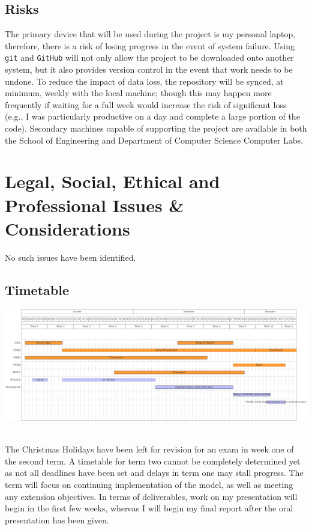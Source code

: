 \documentclass[12pt,a4paper]{article}
\begin{document}
\subsection{Risks}
The primary device that will be used during the project is my personal laptop, therefore, there is a risk of losing 
progress in the event of system failure. Using \texttt{git} and \texttt{GitHub} will not only allow the project to 
be downloaded onto another system, but it also provides version control in the event that work needs to be undone. 
To reduce the impact of data loss, the repository will be synced, at minimum, weekly with the local machine; though 
this may happen more frequently if waiting for a full week would increase the risk of significant loss (e.g., I was 
particularly productive on a day and complete a large portion of the code). Secondary machines capable of supporting 
the project are available in both the School of Engineering and Department of Computer Science Computer Labs.


\section{Legal, Social, Ethical and Professional Issues \& Considerations}
No such issues have been identified.


\begin{landscape}
    \section{Timetable}

    \noindent\centerline{\includegraphics[scale=0.7]{chart.pdf}} \\

    \noindent The Christmas Holidays have been left for revision for an exam in week one of the second term. A 
    timetable for term two cannot be completely determined yet as not all deadlines have been set and delays in term 
    one may stall progress. The term will focus on continuing implementation of the model, as well as meeting any 
    extension objectives. In terms of deliverables, work on my presentation will begin in the first few weeks, 
    whereas I will begin my final report after the oral presentation has been given.
\end{landscape}




\end{document}
